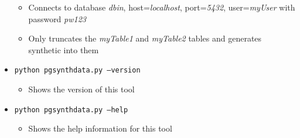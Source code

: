 \begin{itemize}
\begin{itemize}
		\item Connects to database \textit{dbin}, host=\textit{localhost}, port=\textit{5432}, user=\textit{myUser} with password \textit{pw123}
		\item Only truncates the \textit{myTable1} and \textit{myTable2} tables and generates synthetic into them
	\end{itemize}
	\item \texttt{python pgsynthdata.py --version}
	\begin{itemize}
		\item Shows the version of this tool
	\end{itemize}
	\item \texttt{python pgsynthdata.py --help}
	\begin{itemize}
		\item Shows the help information for this tool
	\end{itemize}
\end{itemize}